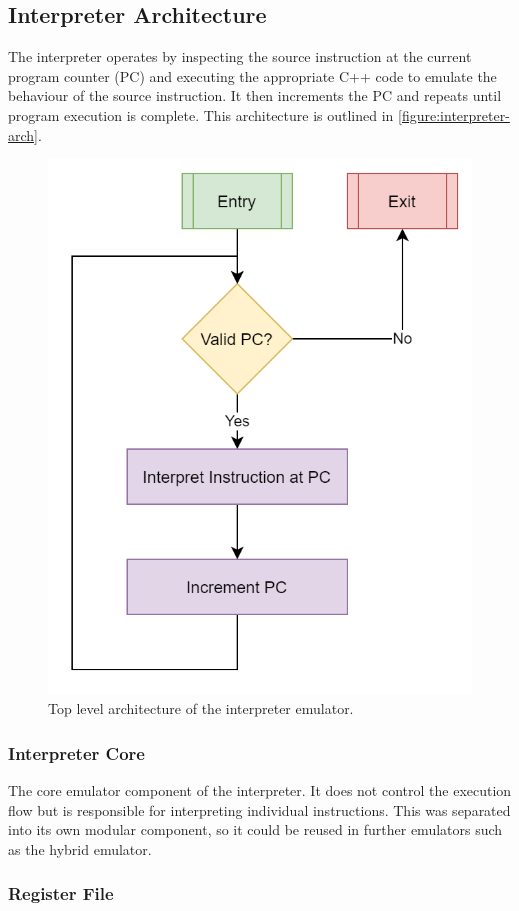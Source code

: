 \subsection{Interpreter Architecture}

The interpreter operates by inspecting the source instruction at the current program counter (PC) and executing the appropriate C++ code to emulate the behaviour of the source instruction. It then increments the PC and repeats until program execution is complete. This architecture is outlined in \autoref{figure:interpreter-arch}.

\begin{figure}[h]
    \centering
    \includegraphics[width=0.5\linewidth]{diagrams/interpreter.png}
    \caption{Top level architecture of the interpreter emulator.}
    \label{figure:interpreter-arch}
\end{figure}

\subsubsection{Interpreter Core}

The core emulator  component of the interpreter. It does not control the execution flow but is responsible for interpreting individual instructions. This was separated into its own modular component, so it could be reused in further emulators such as the hybrid emulator.

\subsubsection{Register File}
\label{section:interpreter-reg-file}


